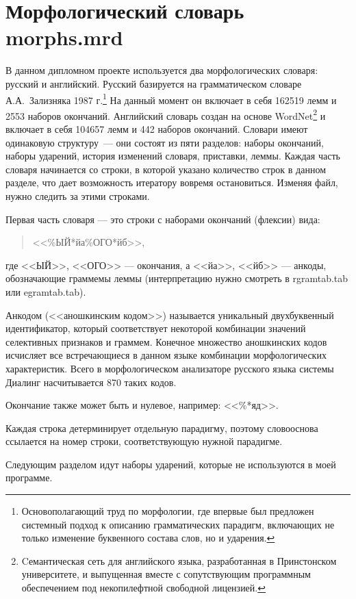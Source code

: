 \documentclass[12pt,a4paper,onecolumn]{report}
\begin{document}
\chapter{Морфологический словарь morphs.mrd}
\par В данном дипломном проекте используется два морфологических словаря: русский и английский. Русский базируется на грамматическом словаре А.А.~Зализняка 1987 г.\footnote{Основополагающий труд по морфологии, где впервые был предложен системный подход к описанию грамматических парадигм, включающих не только изменение буквенного состава слов, но и ударения.} На данный момент он включает в себя 162519 лемм и 2553 наборов окончаний. Английский словарь создан на основе WordNet\footnote{Cемантическая сеть для английского языка, разработанная в Принстонском университете, и выпущенная вместе с сопутствующим программным обеспечением под некопилефтной свободной лицензией.} и включает в себя 104657 лемм и 442 наборов окончаний. Словари имеют одинаковую структуру~--- они состоят из пяти разделов: наборы окончаний, наборы ударений, история изменений словаря, приставки, леммы. Каждая часть словаря начинается со строки, в которой указано количество строк в данном разделе, что дает возможность итератору вовремя остановиться. Изменяя файл, нужно следить за этими строками.

Первая часть словаря --- это строки с наборами окончаний (флексии) вида: 
\begin{quotation}
<<\%ЫЙ*йа\%ОГО*йб>>,
\end{quotation}

где <<ЫЙ>>, <<ОГО>> --- окончания, а <<йа>>, <<йб>> --- анкоды, обозначающие граммемы леммы (интерпретацию нужно смотреть в rgramtab.tab или egramtab.tab).

Анкодом (<<аношкинским кодом>>) называется уникальный двухбуквенный идентификатор, который соответствует некоторой комбинации значений селективных признаков и граммем. Конечное множество аношкинских кодов исчисляет все встречающиеся в данном языке комбинации морфологических характеристик. Всего в морфологическом анализаторе русского языка системы Диалинг насчитывается 870 таких кодов.

Окончание также может быть и нулевое, например: <<\%*яд>>.

Каждая строка детерминирует отдельную парадигму, поэтому словооснова ссылается на номер строки, соответствующую нужной парадигме.

Следующим разделом идут наборы ударений, которые не используются в моей программе.
\end{document}
